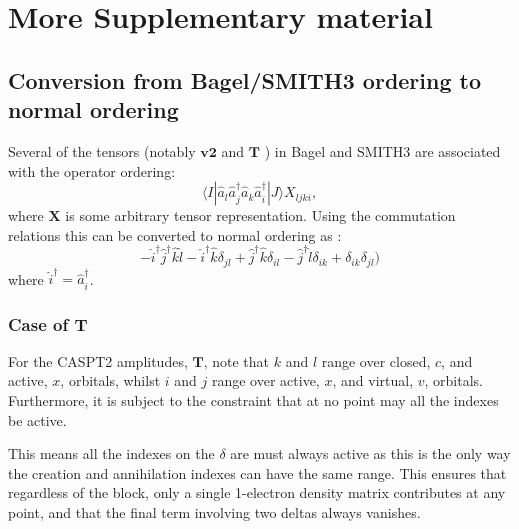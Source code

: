 \documentclass[12pt]{article}
\begin{document}
\section{ More Supplementary material }
\subsection{ Conversion from Bagel/SMITH3 ordering to normal ordering } 

Several of the tensors (notably $\mathbf{v2}$ and $\mathbf{T}$ )  in Bagel and SMITH3 are associated with the operator
ordering:
\begin{equation}
\langle I | \hat{a}_{l} \hat{a}_{j}^{\dagger} \hat{a}_{k} \hat{a}_{i}^{\dagger} | J \rangle X_{ljki},
\end{equation}
where $\mathbf{X}$ is some arbitrary tensor representation.  Using the commutation relations this can be
converted to normal ordering as :
\begin{equation}
- \hat{i}^{\dagger} \hat{j}^{\dagger} \hat{k}\hat{l} 
- \hat{i}^{\dagger} \hat{k} \delta_{jl}
+ \hat{j}^{\dagger} \hat{k} \delta_{il} 
- \hat{j}^{\dagger} \hat{l} \delta_{ik}
+ \delta_{ik}\delta_{jl} )
\end{equation}
where  $ \hat{i}^{\dagger} =\hat{a}_{i}^{\dagger}$. 

\subsubsection{ Case of $\mathbf{T}$ } 
For the CASPT2 amplitudes, $\mathbf{T}$, note that $k$ and $l$  range over closed, $c$, and active, $x$, orbitals, whilst 
$i$ and $j$ range over active, $x$, and virtual, $v$, orbitals. Furthermore, it is subject to the constraint that
at no point may all the indexes be active.

\noindent This means all the indexes on the  $\delta$ are must always active as 
this is the only way the creation and annihilation indexes can have the same range. This 
ensures that regardless of the block, only a single 1-electron density matrix contributes
at any point, and that the final term involving two deltas always vanishes.\\
\end{document}
